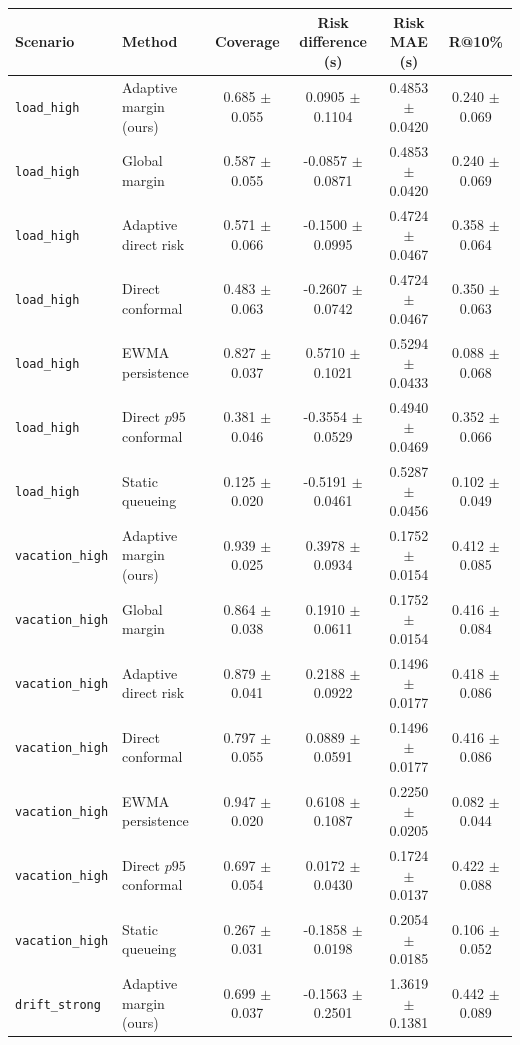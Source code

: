 \begin{tabular}{llcccc}
\hline
Scenario & Method & Coverage & Risk difference (s) & Risk MAE (s) & R@10\% \\
\hline
\texttt{load\_high} & Adaptive margin (ours) & 0.685 $\pm$ 0.055 & 0.0905 $\pm$ 0.1104 & 0.4853 $\pm$ 0.0420 & 0.240 $\pm$ 0.069 \\
\texttt{load\_high} & Global margin & 0.587 $\pm$ 0.055 & -0.0857 $\pm$ 0.0871 & 0.4853 $\pm$ 0.0420 & 0.240 $\pm$ 0.069 \\
\texttt{load\_high} & Adaptive direct risk & 0.571 $\pm$ 0.066 & -0.1500 $\pm$ 0.0995 & 0.4724 $\pm$ 0.0467 & 0.358 $\pm$ 0.064 \\
\texttt{load\_high} & Direct conformal & 0.483 $\pm$ 0.063 & -0.2607 $\pm$ 0.0742 & 0.4724 $\pm$ 0.0467 & 0.350 $\pm$ 0.063 \\
\texttt{load\_high} & EWMA persistence & 0.827 $\pm$ 0.037 & 0.5710 $\pm$ 0.1021 & 0.5294 $\pm$ 0.0433 & 0.088 $\pm$ 0.068 \\
\texttt{load\_high} & Direct $p95$ conformal & 0.381 $\pm$ 0.046 & -0.3554 $\pm$ 0.0529 & 0.4940 $\pm$ 0.0469 & 0.352 $\pm$ 0.066 \\
\texttt{load\_high} & Static queueing & 0.125 $\pm$ 0.020 & -0.5191 $\pm$ 0.0461 & 0.5287 $\pm$ 0.0456 & 0.102 $\pm$ 0.049 \\
\hline
\texttt{vacation\_high} & Adaptive margin (ours) & 0.939 $\pm$ 0.025 & 0.3978 $\pm$ 0.0934 & 0.1752 $\pm$ 0.0154 & 0.412 $\pm$ 0.085 \\
\texttt{vacation\_high} & Global margin & 0.864 $\pm$ 0.038 & 0.1910 $\pm$ 0.0611 & 0.1752 $\pm$ 0.0154 & 0.416 $\pm$ 0.084 \\
\texttt{vacation\_high} & Adaptive direct risk & 0.879 $\pm$ 0.041 & 0.2188 $\pm$ 0.0922 & 0.1496 $\pm$ 0.0177 & 0.418 $\pm$ 0.086 \\
\texttt{vacation\_high} & Direct conformal & 0.797 $\pm$ 0.055 & 0.0889 $\pm$ 0.0591 & 0.1496 $\pm$ 0.0177 & 0.416 $\pm$ 0.086 \\
\texttt{vacation\_high} & EWMA persistence & 0.947 $\pm$ 0.020 & 0.6108 $\pm$ 0.1087 & 0.2250 $\pm$ 0.0205 & 0.082 $\pm$ 0.044 \\
\texttt{vacation\_high} & Direct $p95$ conformal & 0.697 $\pm$ 0.054 & 0.0172 $\pm$ 0.0430 & 0.1724 $\pm$ 0.0137 & 0.422 $\pm$ 0.088 \\
\texttt{vacation\_high} & Static queueing & 0.267 $\pm$ 0.031 & -0.1858 $\pm$ 0.0198 & 0.2054 $\pm$ 0.0185 & 0.106 $\pm$ 0.052 \\
\hline
\texttt{drift\_strong} & Adaptive margin (ours) & 0.699 $\pm$ 0.037 & -0.1563 $\pm$ 0.2501 & 1.3619 $\pm$ 0.1381 & 0.442 $\pm$ 0.089 \\

\end{tabular}
